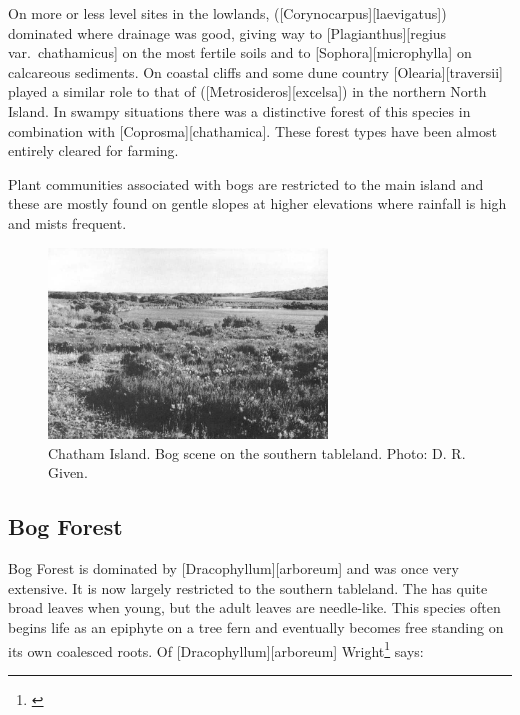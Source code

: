 On more or less level sites in the lowlands,  ([Corynocarpus][laevigatus]) dominated where drainage was good, giving way to [Plagianthus][regius var.\ chathamicus] on the most fertile soils and to [Sophora][microphylla] on calcareous sediments.
On coastal cliffs and some dune country [Olearia][traversii] played a similar role to that of  ([Metrosideros][excelsa]) in the northern North Island.
In swampy situations there was a distinctive forest of this species in combination with [Coprosma][chathamica].
These forest types have been almost entirely cleared for farming.

Plant communities associated with bogs are restricted to the main island and these are mostly found on gentle slopes at higher elevations where rainfall is high and mists frequent.

\begin{figure}
	\includegraphics[width=0.66\textwidth]{graphics/figure119chatham-island-bog.jpg}
	\centering
	\caption[Chatham Island bog scene]{Chatham Island.
	Bog scene on the southern tableland.
	Photo: D. R. Given.}%
	\label{fig:119chatham-island-bog}
\end{figure}

\subsection{Bog Forest}

Bog Forest is dominated by [Dracophyllum][arboreum] and was once very extensive.
It is now largely restricted to the southern tableland.
The  has quite broad leaves when young, but the adult leaves are needle-like.
This species often begins life as an epiphyte on a tree fern and eventually becomes free standing on its own coalesced roots.
Of [Dracophyllum][arboreum] Wright\footnote{\cite{wright1959soils}} says:

